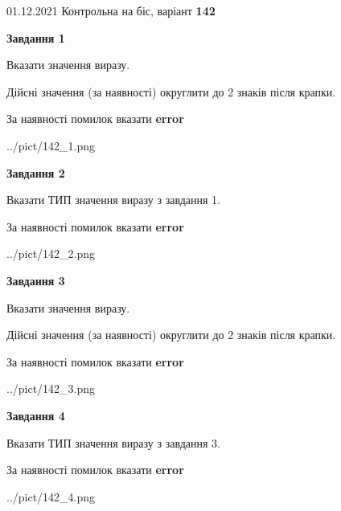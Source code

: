 \documentclass[11pt, ukrainian]{article}
\begin{document}
{01.12.2021 Контрольна на біс, варіант  \No \textbf { 142 }\par}
{
\begin {large}
{\begin {center}\textbf{Завдання 1}\end {center}}\par
Вказати значення виразу. \par
Дійсні значення (за наявності) округлити до 2 знаків після крапки. \par
За наявності помилок вказати \textbf{error}

\begin{center}
	{../pict/142_1.png}
\end{center}
\newpage

{\begin {center}\textbf{Завдання 2}\end {center}}\par
Вказати ТИП значення виразу з завдання 1. \par
За наявності помилок вказати \textbf{error}

\begin{center}
	{../pict/142_2.png}
\end{center}
\newpage

{\begin {center}\textbf{Завдання 3}\end {center}}\par
Вказати значення виразу. \par
Дійсні значення (за наявності) округлити до 2 знаків після крапки. \par
За наявності помилок вказати \textbf{error}

\begin{center}
	{../pict/142_3.png}
\end{center}
\newpage

{\begin {center}\textbf{Завдання 4}\end {center}}\par
Вказати ТИП значення виразу з завдання 3. \par
За наявності помилок вказати \textbf{error}

\begin{center}
	{../pict/142_4.png}
\end{center}
\newpage


\end{large}}
\end{document}
